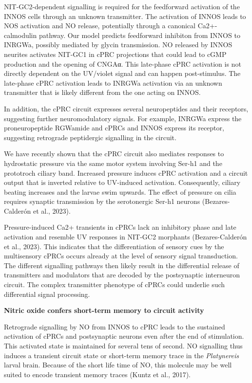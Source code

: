 \documentclass[
  10pt,
  onecolumn]{article}
\begin{document}
NIT-GC2-dependent signalling is required for the feedforward activation
of the INNOS cells through an unknown transmitter. The activation of
INNOS leads to NOS activation and NO release, potentially through a
canonical Ca2+-calmodulin pathway. Our model predicts feedforward
inhibiton from INNOS to INRGWa, possibly mediated by glycin
transmission. NO released by INNOS neurites activates NIT-GC1 in cPRC
projections that could lead to cGMP production and the opening of CNGAα.
This late-phase cPRC activation is not directly dependent on the
UV/violet signal and can happen post-stimulus. The late-phase cPRC
activation leads to INRGWa activation via an unknown transmitter that is
likely different from the one acting on INNOS.

In addition, the cPRC circuit expresses several neuropeptides and their
receptors, suggesting further neuromodulatory signals. For example,
INRGWa express the proneuropeptide RGWamide and cPRCs and INNOS express
its receptor, suggesting retrograde peptidergic signalling in the
circuit.

We have recently shown that the cPRC circuit also mediates responses to
hydrostatic pressure via the same motor system involving Ser-h1 and the
prototroch ciliary band. Increased pressure induces cPRC activation and
a circuit output that is inverted relative to UV-induced activation.
Consequently, ciliary beating increases and the larvae swim upwards. The
effect of pressure on cilia requires synaptic transmission by the
serotonergic Ser-h1 neurons (Bezares-Calderón et al., 2023).

Pressure-induced Ca2+ transients in cPRCs lack an inhibitory phase and
late activation and resemble UV responses in NIT-GC2 morphants
(Bezares-Calderón et al., 2023). This indicates that the differentiation
of sensory cues by the multisensory cPRCs occurs already at the level of
sensory signal transduction. The different signalling pathways then
likely result in the differential release of transmitters and modulators
that are decoded by the postsynaptic interneuron circuit. The complex
transmitter phenotype of cPRCs could underlie such differential signal
processing.

\textbf{Nitric oxide confers short-term memory to circuit activity}

Retrograde signalling by NO from INNOS to cPRC leads to the sustained
activation of cPRCs and postsynaptic neurons even after the end of
stimulation. This activated state is maintained for several tens of
second. NO signalling thus induces a transient circuit state or
short-term memory trace in the \emph{Platynereis} larval brain. Because
of the short life time of NO, this molecule may be well suited to encode
transient memory traces (Kuntz et al., 2017).
\end{document}
